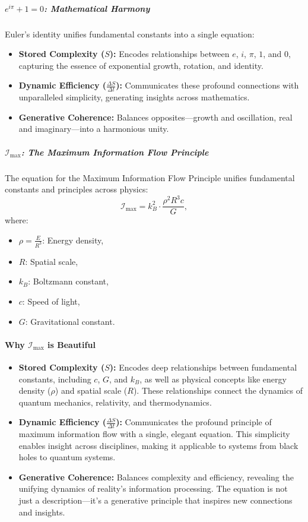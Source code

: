 \documentclass[12pt]{article}
\begin{document}
\subparagraph{\( e^{i\pi} + 1 = 0 \): Mathematical Harmony}
Euler’s identity unifies fundamental constants into a single equation:
\begin{itemize}
    \item \textbf{Stored Complexity (\(S\)):} Encodes relationships between \(e\), \(i\), \(\pi\), \(1\), and \(0\), capturing the essence of exponential growth, rotation, and identity.
    \item \textbf{Dynamic Efficiency (\(\frac{\Delta S}{\Delta t}\)):} Communicates these profound connections with unparalleled simplicity, generating insights across mathematics.
    \item \textbf{Generative Coherence:} Balances opposites—growth and oscillation, real and imaginary—into a harmonious unity.
\end{itemize}

\subparagraph{\(\mathcal{I}_{\text{max}}\): The Maximum Information Flow Principle}
The equation for the Maximum Information Flow Principle unifies fundamental constants and principles across physics:
\[
\mathcal{I}_{\text{max}} = k_B^2 \cdot \frac{\rho^2 R^3 c}{G},
\]
where:
\begin{itemize}
    \item $\rho = \frac{E}{R^3}$: Energy density,
    \item $R$: Spatial scale,
    \item $k_B$: Boltzmann constant,
    \item $c$: Speed of light,
    \item $G$: Gravitational constant.
\end{itemize}

\paragraph{Why \(\mathcal{I}_{\text{max}}\) is Beautiful}
\begin{itemize}
    \item \textbf{Stored Complexity (\(S\)):}  
    Encodes deep relationships between fundamental constants, including \( c \), \( G \), and \( k_B \), as well as physical concepts like energy density (\( \rho \)) and spatial scale (\( R \)). These relationships connect the dynamics of quantum mechanics, relativity, and thermodynamics.
    
    \item \textbf{Dynamic Efficiency (\(\frac{\Delta S}{\Delta t}\)):}  
    Communicates the profound principle of maximum information flow with a single, elegant equation. This simplicity enables insight across disciplines, making it applicable to systems from black holes to quantum systems.
    
    \item \textbf{Generative Coherence:}  
    Balances complexity and efficiency, revealing the unifying dynamics of reality’s information processing. The equation is not just a description—it’s a generative principle that inspires new connections and insights.
\end{itemize}
\end{document}
